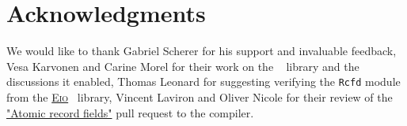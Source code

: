 \section*{Acknowledgments}

We would like to thank Gabriel Scherer for his support and invaluable feedback, Vesa Karvonen and Carine Morel for their work on the \Saturn~\cite{saturn} library and the discussions it enabled, Thomas Leonard for suggesting verifying the \texttt{Rcfd} module from the \href{https://github.com/ocaml-multicore/eio}{\textsc{Eio}}~\cite{eio} library, Vincent Laviron and Oliver Nicole for their review of the \href{https://github.com/ocaml/ocaml/pull/13404}{"Atomic record fields"} pull request to the \OCaml compiler.